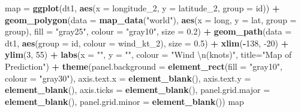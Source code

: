 \documentclass[]{article}
\newenvironment{Shaded}{\begin{snugshade}}{\end{snugshade}}
\newcommand{\CharTok}[1]{\textcolor[rgb]{0.31,0.60,0.02}{#1}}
\newcommand{\DataTypeTok}[1]{\textcolor[rgb]{0.13,0.29,0.53}{#1}}
\newcommand{\DecValTok}[1]{\textcolor[rgb]{0.00,0.00,0.81}{#1}}
\newcommand{\FloatTok}[1]{\textcolor[rgb]{0.00,0.00,0.81}{#1}}
\newcommand{\KeywordTok}[1]{\textcolor[rgb]{0.13,0.29,0.53}{\textbf{#1}}}
\newcommand{\NormalTok}[1]{#1}
\newcommand{\OperatorTok}[1]{\textcolor[rgb]{0.81,0.36,0.00}{\textbf{#1}}}
\newcommand{\StringTok}[1]{\textcolor[rgb]{0.31,0.60,0.02}{#1}}
\begin{document}
\begin{Shaded}
\begin{Highlighting}[]
\NormalTok{map =}\StringTok{ }\KeywordTok{ggplot}\NormalTok{(dt1, }\KeywordTok{aes}\NormalTok{(}\DataTypeTok{x =}\NormalTok{ longitude_}\DecValTok{2}\NormalTok{, }\DataTypeTok{y =}\NormalTok{ latitude_}\DecValTok{2}\NormalTok{, }\DataTypeTok{group =}\NormalTok{ id)) }\OperatorTok{+}\StringTok{ }
\StringTok{  }\KeywordTok{geom_polygon}\NormalTok{(}\DataTypeTok{data =} \KeywordTok{map_data}\NormalTok{(}\StringTok{"world"}\NormalTok{), }
               \KeywordTok{aes}\NormalTok{(}\DataTypeTok{x =}\NormalTok{ long, }\DataTypeTok{y =}\NormalTok{ lat, }\DataTypeTok{group =}\NormalTok{ group), }
               \DataTypeTok{fill =} \StringTok{"gray25"}\NormalTok{, }\DataTypeTok{colour =} \StringTok{"gray10"}\NormalTok{, }\DataTypeTok{size =} \FloatTok{0.2}\NormalTok{) }\OperatorTok{+}\StringTok{ }
\StringTok{  }\KeywordTok{geom_path}\NormalTok{(}\DataTypeTok{data =}\NormalTok{ dt1, }\KeywordTok{aes}\NormalTok{(}\DataTypeTok{group =}\NormalTok{ id, }\DataTypeTok{colour =}\NormalTok{ wind_kt_}\DecValTok{2}\NormalTok{), }\DataTypeTok{size =} \FloatTok{0.5}\NormalTok{) }\OperatorTok{+}\StringTok{ }
\StringTok{  }\KeywordTok{xlim}\NormalTok{(}\OperatorTok{-}\DecValTok{138}\NormalTok{, }\DecValTok{-20}\NormalTok{) }\OperatorTok{+}\StringTok{ }\KeywordTok{ylim}\NormalTok{(}\DecValTok{3}\NormalTok{, }\DecValTok{55}\NormalTok{) }\OperatorTok{+}\StringTok{ }
\StringTok{  }\KeywordTok{labs}\NormalTok{(}\DataTypeTok{x =} \StringTok{""}\NormalTok{, }\DataTypeTok{y =} \StringTok{""}\NormalTok{, }\DataTypeTok{colour =} \StringTok{"Wind }\CharTok{\textbackslash{}n}\StringTok{(knots)"}\NormalTok{, }\DataTypeTok{title=}\StringTok{"Map of Prediction"}\NormalTok{) }\OperatorTok{+}\StringTok{ }
\StringTok{  }\KeywordTok{theme}\NormalTok{(}\DataTypeTok{panel.background =} \KeywordTok{element_rect}\NormalTok{(}\DataTypeTok{fill =} \StringTok{"gray10"}\NormalTok{, }\DataTypeTok{colour =} \StringTok{"gray30"}\NormalTok{),}
        \DataTypeTok{axis.text.x =} \KeywordTok{element_blank}\NormalTok{(), }\DataTypeTok{axis.text.y =} \KeywordTok{element_blank}\NormalTok{(), }
        \DataTypeTok{axis.ticks =} \KeywordTok{element_blank}\NormalTok{(), }\DataTypeTok{panel.grid.major =} \KeywordTok{element_blank}\NormalTok{(),}
        \DataTypeTok{panel.grid.minor =} \KeywordTok{element_blank}\NormalTok{())}
\NormalTok{map}


\end{Highlighting}
\end{Shaded}
\end{document}
